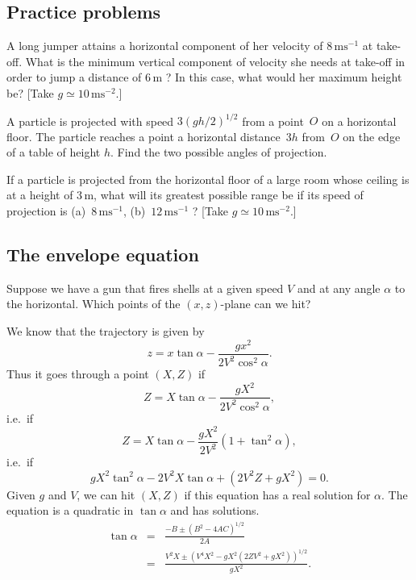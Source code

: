 \subsection*{Practice problems}

\vspace{3mm}
\noindent \theexamplecounter
\label{Q:7.1}
A long jumper attains a horizontal component of her velocity of
$8 \, \mathrm{ms^{-1}}$ at take-off. What is the minimum vertical component
of velocity she needs at take-off in order to jump a distance of $6 \, \mathrm{m}$ ?
In this case, what would her maximum height be?
[Take $g\simeq 10 \, \mathrm{ms}^{-2}$.] 


\vspace{3mm}
\noindent \theexamplecounter
\label{Q:7.2}
A particle is projected with speed $3 (gh / 2)^{1/2}$ from a point~$O$ on a
horizontal floor. The particle reaches a point a horizontal distance~$3h$
from~$O$ on the edge of a table of height $h$. Find
the two possible angles of projection. 


\vspace{3mm}
\noindent \theexamplecounter
\label{Q:7.3}
If a particle is projected from the horizontal floor of a large
room whose ceiling is at a height of $3 \, \mathrm{m}$, what will its greatest
possible range be if its speed of projection is (a)~$8 \,\mathrm{ms^{-1}}$,
(b)~$12 \, \mathrm{ms^{-1}}$ ?
[Take $g\simeq 10 \, \mathrm{ms}^{-2}$.] 


\subsection{The envelope equation}
\label{sec:envelope}

Suppose we have a gun that fires shells at a given speed $V$ and at any angle $\alpha$
to the horizontal. Which points of the $(x,z)$-plane can we hit?

We know that the trajectory is given by
\begin{displaymath}
z = x \tan \alpha - \frac{g x^2}{2 V^2 \cos^2 \alpha} .
\end{displaymath}
Thus it goes through a point $(X,Z)$ if
\begin{displaymath}
Z = X \tan \alpha - \frac{g X^2}{2 V^2 \cos^2 \alpha} ,
\end{displaymath}
i.e.\ if
\begin{displaymath}
Z = X \tan \alpha - \frac{g X^2}{2 V^2} (1 + \tan^2 \alpha),
\end{displaymath}
i.e.\ if
\begin{displaymath}
g X^2 \tan^2 \alpha - 2 V^2 X \tan \alpha + (2 V^2 Z + g X^2) = 0 .
\end{displaymath}
Given $g$ and $V$, we can hit $(X,Z)$ if this equation has a real solution for $\alpha$.
The equation is a quadratic in $\tan \alpha$ and has solutions.
\begin{eqnarray}
\tan \alpha & = & \frac{-B \pm (B^2 - 4 A C)^{1/2}}{2 A}  \nonumber \\
            & = & \frac{V^2 X \pm (V^4 X^2 - g X^2 (2 Z V^2 + g X^2))^{1/2}}{g X^2} .
\end{eqnarray}


